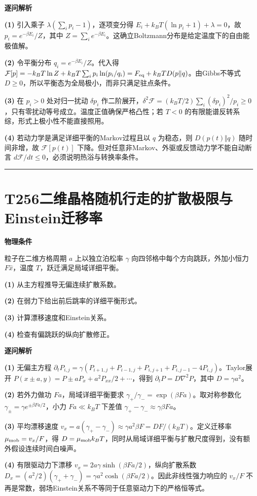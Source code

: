 \documentclass[UTF8,a4paper,11pt,oneside,openany]{ctexbook}
\begin{document}
\par\medskip\noindent\textbf{逐问解析}
\par\noindent\textbf{(1)} 引入乘子 \(\lambda(\sum_i p_i-1)\)，逐项变分得 \(E_i+k_BT(\ln p_i+1)+\lambda=0\)，故 \(p_i=e^{-\beta E_i}/Z\)，其中 \(Z=\sum_i e^{-\beta E_i}\)。这确立Boltzmann分布是给定温度下的自由能极值解。
\par\noindent\textbf{(2)} 令平衡分布 \(q_i=e^{-\beta E_i}/Z\)。代入得 \(\mathcal F[p]=-k_BT\ln Z+k_BT\sum_i p_i\ln(p_i/q_i)=F_{\rm eq}+k_BT D(p\Vert q)\)。由Gibbs不等式 \(D\ge0\)，所以平衡态为全局极小，而非只满足驻点条件。
\par\noindent\textbf{(3)} 在 \(p_i>0\) 处对归一扰动 \(\delta p_i\) 作二阶展开，\(\delta^2\mathcal F=(k_BT/2)\sum_i(\delta p_i)^2/p_i\ge0\)，只有零扰动等号成立。温度正值确保严格凸性；若 \(T<0\) 的有限能谱反转系综，形式上极小性不能直接照用。
\par\noindent\textbf{(4)} 若动力学是满足详细平衡的Markov过程且以 \(q\) 为稳态，则 \(D(p(t)\Vert q)\) 随时间非增，故 \(\mathcal F[p(t)]\) 下降。但对任意非Markov、外驱或反馈动力学不能自动断言 \(d\mathcal F/dt\le0\)，必须说明热浴与转换率条件。

\par\bigskip\hrule\bigskip
\section*{T256\quad 二维晶格随机行走的扩散极限与Einstein迁移率}
\textbf{物理条件}\par 粒子在二维方格周期 \(a\) 上以独立泊松率 \(\gamma\) 向四邻格中每个方向跳跃，外加小恒力 \(F\hat x\)，温度 \(T\)，跃迁满足局域详细平衡。
\par\noindent\textbf{(1)} 从主方程推导无偏连续扩散系数。
\par\noindent\textbf{(2)} 在弱力下给出前后跳率的详细平衡形式。
\par\noindent\textbf{(3)} 计算漂移速度和Einstein关系。
\par\noindent\textbf{(4)} 检查有偏跳跃的纵向扩散修正。

\par\medskip\noindent\textbf{逐问解析}
\par\noindent\textbf{(1)} 无偏主方程 \(\partial_tP_{i,j}=\gamma(P_{i+1,j}+P_{i-1,j}+P_{i,j+1}+P_{i,j-1}-4P_{i,j})\)。Taylor展开 \(P(x\pm a,y)=P\pm aP_x+a^2P_{xx}/2+\cdots\)，得到 \(\partial_tP=D\nabla^2P\)，其中 \(D=\gamma a^2\)。
\par\noindent\textbf{(2)} 若外力做功 \(Fa\)，局域详细平衡要求 \(\gamma_+/\gamma_-=\exp(\beta Fa)\)。取对称参数化 \(\gamma_\pm=\gamma e^{\pm\beta Fa/2}\)，小力 \(Fa\ll k_BT\) 下差值 \(\gamma_+-\gamma_-\approx\gamma\beta Fa\)。
\par\noindent\textbf{(3)} 平均漂移速度 \(v_x=a(\gamma_+-\gamma_-)\approx\gamma a^2\beta F=DF/(k_BT)\)。定义迁移率 \(\mu_{\rm mob}=v_x/F\)，得 \(D=\mu_{\rm mob}k_BT\)，同时从局域详细平衡与扩散尺度得到，没有额外假设连续时间白噪声。
\par\noindent\textbf{(4)} 有限驱动力下漂移 \(v_x=2a\gamma\sinh(\beta Fa/2)\)，纵向扩散系数 \(D_x=(a^2/2)(\gamma_++\gamma_-)=\gamma a^2\cosh(\beta Fa/2)\)。因此非线性强力响应的 \(v_x/F\) 不再是常数，弱场Einstein关系不等同于任意驱动力下的严格恒等式。
\end{document}
